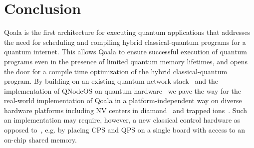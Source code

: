 \section{Conclusion}
\label{qoala:sec:conclusion}
Qoala is the first architecture for executing quantum applications that addresses the need for scheduling and compiling hybrid classical-quantum programs for a quantum internet.
This allows Qoala to ensure successful execution of quantum programs even in the presence of limited quantum memory lifetimes, and opens the door for a compile time optimization of the hybrid classical-quantum program.
By building on an existing quantum network stack~\cite{dahlberg2019link, pompili2022experimental} and the implementation of QNodeOS on quantum hardware~\cite{pompili2022experimental, carlothesis} we pave the way for the real-world implementation of Qoala in a platform-independent way on diverse hardware platforms including NV centers in diamond~\cite{pompili2021realization, pompili2022experimental} and trapped ions~\cite{krutyanskiy2023entanglement,krutyanskiy2023telecom}.
Such an implementation may require, however, a new classical control hardware as opposed to~\cite{pompili2022experimental, carlothesis}, e.g. by placing CPS and QPS on a single board with access to an on-chip shared memory. 

